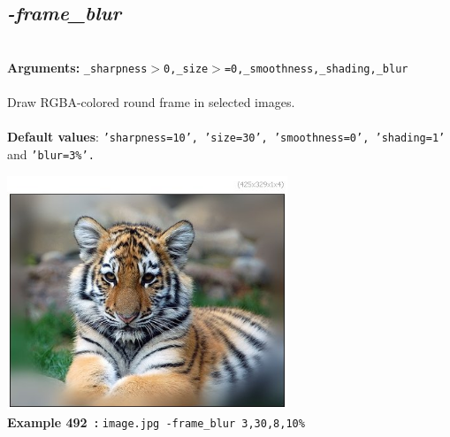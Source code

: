 \documentclass[a4paper,11pt,twoside]{book}
\begin{document}
\subsection{\emph{-frame\_blur} }\vspace*{-0.5em}
~\\\textbf{Arguments: } 
{\small \texttt{\_sharpness$>$0,\_size$>$=0,\_smoothness,\_shading,\_blur}}\\~\\
Draw RGBA-colored round frame in selected images.
~\\~\\\textbf{Default values}: {\small \texttt{'sharpness=10', 'size=30', 'smoothness=0', 'shading=1'} and \texttt{'blur=3\%'.}}
\begin{center}\includegraphics[keepaspectratio=true,height=7cm,width=\textwidth]{img/gmic_def492.jpg}\\
{\footnotesize \textbf{Example 492~:} \texttt{image.jpg -frame\_blur 3,30,8,10\%}}
\end{center}
\end{document}
